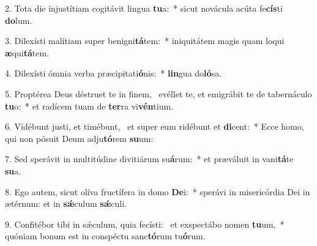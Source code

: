 2. Tota die injustítiam cogitávit lingua \textbf{tu}a:~*  sicut novácula acúta fe\textbf{cís}ti \textbf{do}lum.\

3. Dilexísti malítiam super benigni\textbf{tá}tem:~*  iniquitátem magis quam loqui \textbf{æ}qui\textbf{tá}tem.\

4. Dilexísti ómnia verba præcipitati\textbf{ó}nis:~*  \textbf{lin}gua do\textbf{ló}sa.\

5. Proptérea Deus déstruet te in finem, \dag\  evéllet te, et emigrábit te de tabernáculo \textbf{tu}o:~*  et radícem tuam de \textbf{ter}ra vi\textbf{vén}tium.\

6. Vidébunt justi, et timébunt, \dag\  et super eum ridébunt et \textbf{di}cent:~*  Ecce homo, qui non pósuit Deum adju\textbf{tó}rem \textbf{su}um:\

7. Sed sperávit in multitúdine divitiárum su\textbf{á}rum:~*  et præváluit in vani\textbf{tá}te \textbf{su}a.\

8. Ego autem, sicut olíva fructífera in domo \textbf{De}i:~*  sperávi in misericórdia Dei in ætérnum: et in \textbf{sǽ}culum \textbf{sǽ}culi.\

9. Confitébor tibi in sǽculum, quia fecísti: \dag\  et exspectábo nomen \textbf{tu}um,~*  quóniam bonum est in conspéctu sanc\textbf{tó}rum tu\textbf{ó}rum.\

